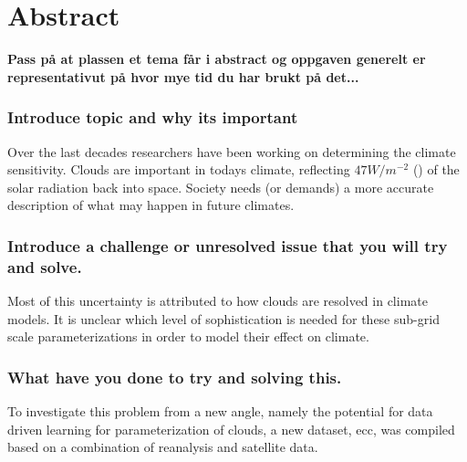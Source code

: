 \chapter*{Abstract}
\textbf{Pass på at plassen et tema får i abstract og oppgaven generelt er representativut på hvor mye tid du har brukt på det...}

\subsection*{Introduce topic and why its important}
Over the last decades researchers have been working on determining the climate sensitivity. %
 Clouds are important in todays climate, reflecting $47W/m^{-2}$ (\cite{Wild2019TheModels}) of the solar radiation back into space. Society needs (or demands) a more accurate description of what may happen in future climates.

\subsection*{Introduce a challenge or unresolved issue that you will try and solve.} Most of this uncertainty is attributed to how clouds are resolved in climate models.
It is unclear which level of sophistication is needed for these sub-grid scale parameterizations in order to model their effect on climate.

\subsection*{What have you done to try and solving this.}
To investigate this problem from a new angle,  namely the potential for data driven learning for parameterization of clouds, a new dataset, \acrfull{ecc}, was compiled based on a combination of reanalysis and satellite data. 

